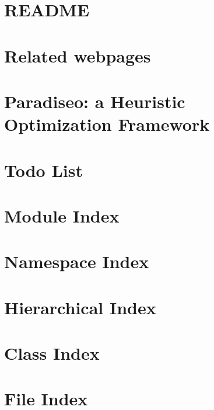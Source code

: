 \let\mypdfximage\pdfximage\def\pdfximage{\immediate\mypdfximage}\documentclass[twoside]{book}
\newcommand{\+}{\discretionary{\mbox{\scriptsize$\hookleftarrow$}}{}{}}
\begin{document}
\chapter{R\+E\+A\+D\+ME}
\label{md__home_aaziz-alaoui__documents__p_f_e__x__paradis_e_o__resources_paradiseo-master_eo_test_mpi_ee69992bbfa2c2b929821886d7b1dbb1}

\chapter{Related webpages}
\label{webpages}

\chapter{Paradiseo\+: a Heuristic Optimization Framework}
\label{md__home_aaziz-alaoui__documents__p_f_e__x__paradis_e_o__resources_paradiseo-master__r_e_a_d_m_e}

\chapter{Todo List}
\label{todo}

\chapter{Module Index}

\chapter{Namespace Index}

\chapter{Hierarchical Index}

\chapter{Class Index}

\chapter{File Index}

\end{document}
